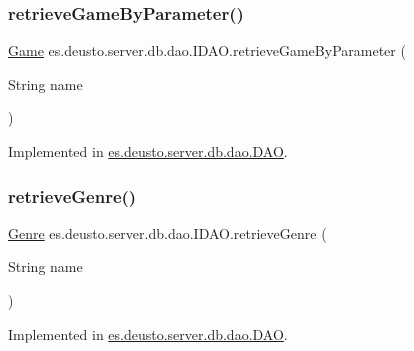 \subsubsection{\texorpdfstring{retrieve\+Game\+By\+Parameter()}{retrieveGameByParameter()}}
{\footnotesize\ttfamily \hyperlink{classes_1_1deusto_1_1server_1_1db_1_1data_1_1_game}{Game} es.\+deusto.\+server.\+db.\+dao.\+I\+D\+A\+O.\+retrieve\+Game\+By\+Parameter (\begin{DoxyParamCaption}\item[{String}]{name }\end{DoxyParamCaption})}



Implemented in \hyperlink{classes_1_1deusto_1_1server_1_1db_1_1dao_1_1_d_a_o_a5ac74c9e59db9f20336d6e68d77c6ed8}{es.\+deusto.\+server.\+db.\+dao.\+D\+AO}.

\mbox{\label{interfacees_1_1deusto_1_1server_1_1db_1_1dao_1_1_i_d_a_o_a8b15955637f9b81c57900761c6d03571}} 
\subsubsection{\texorpdfstring{retrieve\+Genre()}{retrieveGenre()}}
{\footnotesize\ttfamily \hyperlink{classes_1_1deusto_1_1server_1_1db_1_1data_1_1_genre}{Genre} es.\+deusto.\+server.\+db.\+dao.\+I\+D\+A\+O.\+retrieve\+Genre (\begin{DoxyParamCaption}\item[{String}]{name }\end{DoxyParamCaption})}



Implemented in \hyperlink{classes_1_1deusto_1_1server_1_1db_1_1dao_1_1_d_a_o_a16b0af798fbb00cd29a505491c57e2cd}{es.\+deusto.\+server.\+db.\+dao.\+D\+AO}.

\mbox{\label{interfacees_1_1deusto_1_1server_1_1db_1_1dao_1_1_i_d_a_o_aecdf5c34463102b38528152c0dfc9811}} 
